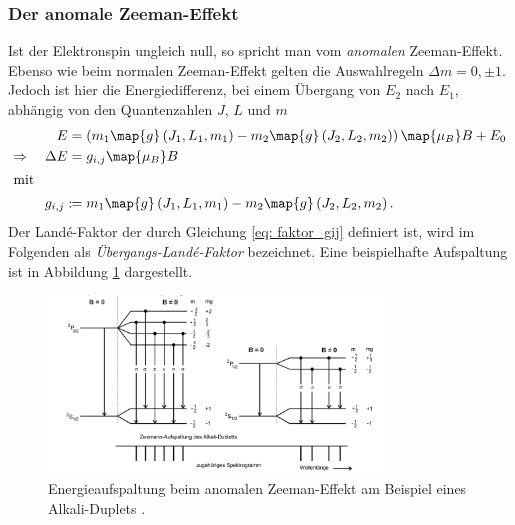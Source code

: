\subsubsection{Der anomale Zeeman-Effekt}
Ist der Elektronspin ungleich null, so spricht man vom \emph{anomalen} Zeeman-Effekt.
Ebenso wie beim normalen Zeeman-Effekt gelten die Auswahlregeln $\Delta m=0, \pm 1$.
Jedoch ist hier die Energiedifferenz, bei einem Übergang von $E_2$ nach $E_1$,
abhängig von den Quantenzahlen $J$, $L$ und $m$
\begin{align}
  E&=\left(m_1\map{g}\left(J_1,L_1,m_1\right)-m_2\map{g}\left(J_2,L_2,m_2\right)\right)\map{\mu_B}B+E_0 \notag \\
  \Rightarrow \quad \Delta E&=g_{i,j}\map{\mu_B}B \label{eq:energie_anomale_zemman}\\
\shortintertext{mit}
g_{i,j}:\!\!&=m_1\map{g}\left(J_1,L_1,m_1\right)-m_2\map{g}\left(J_2,L_2,m_2\right)\label{eq: faktor_gij}.
\end{align}
Der Landé-Faktor der durch Gleichung \eqref{eq: faktor_gij} definiert ist, wird im Folgenden als \emph{Übergangs-Landé-Faktor} bezeichnet.
Eine beispielhafte Aufspaltung ist in Abbildung \ref{fig: energie_aufspaltung_annomaler} dargestellt.
\FloatBarrier
\begin{figure}[h]
  \centering
  \includegraphics[width=0.8\textwidth]{pics/energieaufspaltung_annomaler.png}
  \caption{Energieaufspaltung beim anomalen Zeeman-Effekt am Beispiel eines Alkali-Duplets \cite{anleitung27}.}
  \label{fig: energie_aufspaltung_annomaler}
\end{figure}
\FloatBarrier
